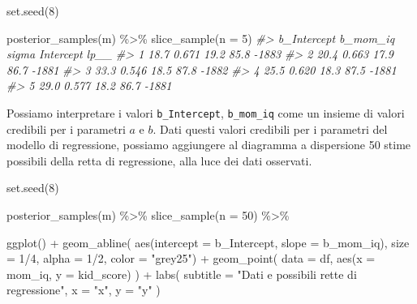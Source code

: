 \documentclass[
  10pt,
  italian,
  a4paper,
  extrafontsizes,onecolumn,openright
  ]{memoir}
\newenvironment{Shaded}{\begin{snugshade}}{\end{snugshade}}
\newcommand{\AttributeTok}[1]{\textcolor[rgb]{0.77,0.63,0.00}{#1}}
\newcommand{\CommentTok}[1]{\textcolor[rgb]{0.56,0.35,0.01}{\textit{#1}}}
\newcommand{\DecValTok}[1]{\textcolor[rgb]{0.00,0.00,0.81}{#1}}
\newcommand{\FunctionTok}[1]{\textcolor[rgb]{0.00,0.00,0.00}{#1}}
\newcommand{\NormalTok}[1]{#1}
\newcommand{\SpecialCharTok}[1]{\textcolor[rgb]{0.00,0.00,0.00}{#1}}
\newcommand{\StringTok}[1]{\textcolor[rgb]{0.31,0.60,0.02}{#1}}
\begin{document}
\begin{Shaded}
\begin{Highlighting}[]
\FunctionTok{set.seed}\NormalTok{(}\DecValTok{8}\NormalTok{)}

\FunctionTok{posterior\_samples}\NormalTok{(m) }\SpecialCharTok{\%\textgreater{}\%} 
  \FunctionTok{slice\_sample}\NormalTok{(}\AttributeTok{n =} \DecValTok{5}\NormalTok{)}
\CommentTok{\#\textgreater{}   b\_Intercept b\_mom\_iq sigma Intercept  lp\_\_}
\CommentTok{\#\textgreater{} 1        18.7    0.671  19.2      85.8 {-}1883}
\CommentTok{\#\textgreater{} 2        20.4    0.663  17.9      86.7 {-}1881}
\CommentTok{\#\textgreater{} 3        33.3    0.546  18.5      87.8 {-}1882}
\CommentTok{\#\textgreater{} 4        25.5    0.620  18.3      87.5 {-}1881}
\CommentTok{\#\textgreater{} 5        29.0    0.577  18.2      86.7 {-}1881}
\end{Highlighting}
\end{Shaded}

Possiamo interpretare i valori \texttt{b\_Intercept}, \texttt{b\_mom\_iq} come un insieme di valori credibili per i parametri \(a\) e \(b\). Dati questi valori credibili per i parametri del modello di regressione, possiamo aggiungere al diagramma a dispersione 50 stime possibili della retta di regressione, alla luce dei dati osservati.

\begin{Shaded}
\begin{Highlighting}[]
\FunctionTok{set.seed}\NormalTok{(}\DecValTok{8}\NormalTok{)}

\FunctionTok{posterior\_samples}\NormalTok{(m) }\SpecialCharTok{\%\textgreater{}\%} 
  \FunctionTok{slice\_sample}\NormalTok{(}\AttributeTok{n =} \DecValTok{50}\NormalTok{) }\SpecialCharTok{\%\textgreater{}\%} 
  
  \FunctionTok{ggplot}\NormalTok{() }\SpecialCharTok{+}
  \FunctionTok{geom\_abline}\NormalTok{(}
    \FunctionTok{aes}\NormalTok{(}\AttributeTok{intercept =}\NormalTok{ b\_Intercept, }\AttributeTok{slope =}\NormalTok{ b\_mom\_iq),}
        \AttributeTok{size =} \DecValTok{1}\SpecialCharTok{/}\DecValTok{4}\NormalTok{, }\AttributeTok{alpha =} \DecValTok{1}\SpecialCharTok{/}\DecValTok{2}\NormalTok{, }\AttributeTok{color =} \StringTok{"grey25"}\NormalTok{) }\SpecialCharTok{+}
  \FunctionTok{geom\_point}\NormalTok{(}
    \AttributeTok{data =}\NormalTok{ df,}
    \FunctionTok{aes}\NormalTok{(}\AttributeTok{x =}\NormalTok{ mom\_iq, }\AttributeTok{y =}\NormalTok{ kid\_score)}
\NormalTok{  ) }\SpecialCharTok{+}
  \FunctionTok{labs}\NormalTok{(}
    \AttributeTok{subtitle =} \StringTok{"Dati e possibili rette di regressione"}\NormalTok{,}
    \AttributeTok{x =} \StringTok{"x"}\NormalTok{,}
    \AttributeTok{y =} \StringTok{"y"}
\NormalTok{  ) }
\end{Highlighting}
\end{Shaded}
\end{document}
